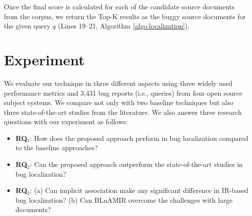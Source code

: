 \documentclass[conference]{IEEEtran}
\begin{document}
Once the final score is calculated for each of the candidate source documents from the corpus, we return the Top-K results as the buggy source documents for the given query $q$ (Lines 19--21, Algorithm \ref{algo:localization}).


\section{Experiment} \label{sec:expANDdiss}
We evaluate our technique in three different aspects using
three widely used performance metrics and 3,431 bug reports (i.e.,
queries) from four open source subject systems. We compare not only with two baseline techniques \cite{vector-space-model,MarcusLSI} but also three state-of-the-art studies \cite{Nguyen,Jian,Saha} from the literature. We also answer three research questions with our experiment as follows: 
\begin{itemize}
	\item \textbf{RQ$_1$}: How does the proposed approach perform in bug localization compared to the baseline approaches? 
	\item \textbf{RQ$_2$}: Can the proposed approach outperform the state-of-the-art studies in bug localization?
	\item \textbf{RQ$_3$}: (a) Can implicit association make any significant difference in IR-based bug localization? (b) Can BLuAMIR overcome the challenges with large documents?   
\end{itemize}
\end{document}
